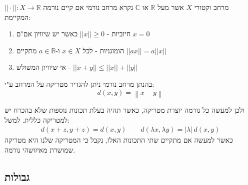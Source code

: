 \documentclass{tstextbook}
\begin{document}
\begin{definition}[נורמה]
מרחב וקטורי \(X\) אשר מעל \(\mathbb{R}\) או \(\mathbb{C}\) נקרא מרחב נורמי אם קיים נורמה \(||\cdot||:X\to \mathbb{R}\) המקיימת:

\end{definition}
\begin{enumerate}
  \item חיוביות - \(||x||\geq 0\) כאשר יש שיוויון אם"ם \(x=0\)


  \item הומוגניות - לכל \(x \in X\) ו-\(a\in \mathbb{R}\) מתקיים \(||ax||=a||x||\)


  \item אי שיוויון המשולש - \(||x+y||\leq||x||+||y||\)


\end{enumerate}
\begin{definition}
בהנתן מרחב נורמי ניתן להגדיר מטריקה על המרחב ע"י:
$$d(x,y)=\left\|x-y\right\|$$

\end{definition}
ולכן למעשה כל נורמה יוצרת מטריקה, כאשר תהיה בעלת תכונות נוספות שלא בהכרח יש למטריקה כללית. למשל:
$$\begin{array}{c}{{d(x+z,y+z)=d(x,y)}}\qquad  {{d\left( \lambda x,\lambda y \right)=|\lambda|\,d(x,y)}}\end{array}$$
כאשר למעשה אם מתקיים שתי התכונות האלו, נקבל כי המטריקה שלנו היא מטריקה שמושרת מאיזושהי נורמה.

\subsection{גבולות}
\end{document}
